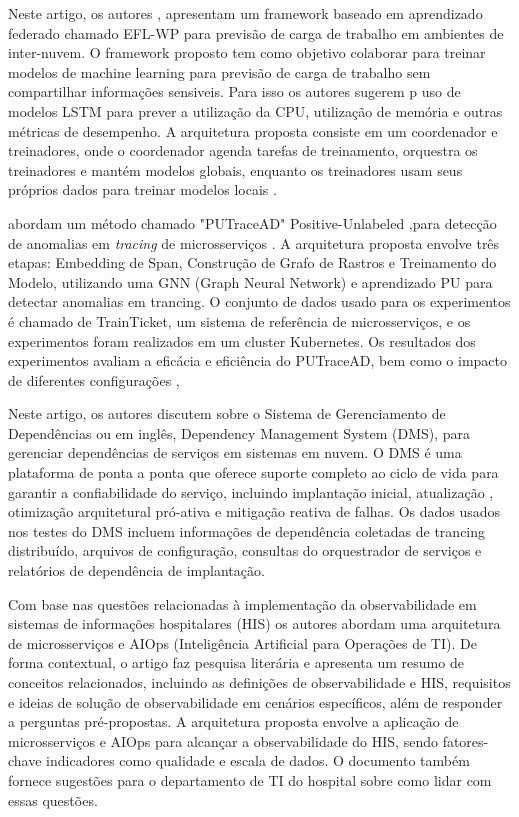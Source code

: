 Neste artigo, os autores \cite{9892264}, apresentam um framework baseado em aprendizado federado chamado EFL-WP para previsão de carga de trabalho em ambientes de inter-nuvem. O framework proposto tem como objetivo colaborar para treinar modelos de machine learning para previsão de carga de trabalho sem compartilhar informações sensiveis. Para isso os autores sugerem p uso de modelos LSTM para prever a utilização da CPU, utilização de memória e outras métricas de desempenho. A arquitetura proposta consiste em um coordenador e treinadores, onde o coordenador agenda tarefas de treinamento, orquestra os treinadores e mantém modelos globais, enquanto os treinadores usam seus próprios dados para treinar modelos locais .


\cite{9978983} abordam um método chamado "PUTraceAD" Positive-Unlabeled ,para  detecção de anomalias em \textit{tracing} de microsserviços . A arquitetura proposta envolve três etapas: Embedding de Span, Construção de Grafo de Rastros e Treinamento do Modelo, utilizando uma GNN (Graph Neural Network) e aprendizado PU para detectar anomalias em trancing. O conjunto de dados usado para os experimentos é chamado de TrainTicket, um sistema de referência de microsserviços, e os experimentos foram realizados em um cluster Kubernetes. Os resultados dos experimentos avaliam a eficácia e eficiência do PUTraceAD, bem como o impacto de diferentes configurações ,

Neste artigo, os autores\cite{9985105} discutem sobre o Sistema de Gerenciamento de Dependências ou em inglês, Dependency Management System (DMS), para gerenciar dependências de serviços em sistemas em nuvem. O DMS é uma plataforma de ponta a ponta que oferece suporte completo ao ciclo de vida para garantir a confiabilidade do serviço, incluindo implantação inicial, atualização , otimização arquitetural pró-ativa e mitigação reativa de falhas. Os dados usados nos testes do DMS incluem informações de dependência coletadas de trancing distribuído, arquivos de configuração, consultas do orquestrador de serviços e relatórios de dependência de implantação.


Com base nas questões relacionadas à implementação da observabilidade em sistemas de informações hospitalares (HIS) os autores \cite{10004053} abordam uma arquitetura de microsserviços e AIOps (Inteligência Artificial para Operações de TI). De forma contextual, o artigo faz pesquisa literária e apresenta um resumo de conceitos relacionados, incluindo as definições de observabilidade e HIS, requisitos e ideias de solução de observabilidade em cenários específicos, além de responder a perguntas pré-propostas. A arquitetura proposta envolve a aplicação de microsserviços e AIOps para alcançar a observabilidade do HIS, sendo fatores-chave indicadores como qualidade e escala de dados. O documento também fornece sugestões para o departamento de TI do hospital sobre como lidar com essas questões. 

